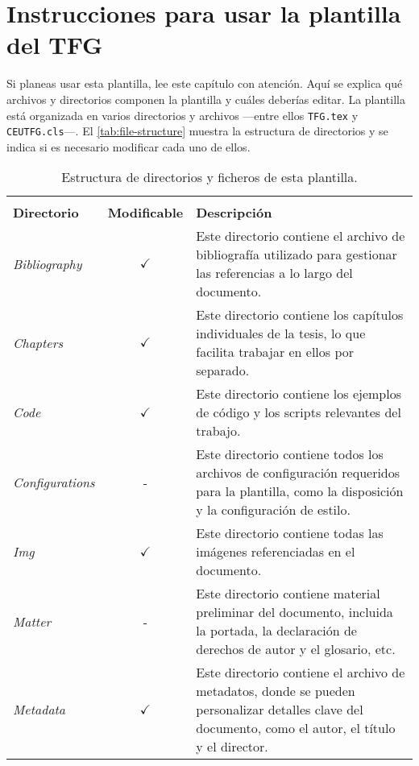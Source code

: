 \chapter[Instrucciones plantilla]{Instrucciones para usar la plantilla del TFG}
\label{cp:user-guide}

Si planeas usar esta plantilla, lee este capítulo con atención. Aquí se explica qué archivos y directorios componen la plantilla y cuáles deberías editar. La plantilla está organizada en varios directorios y archivos —entre ellos \texttt{TFG.tex} y \texttt{CEUTFG.cls}—. El \autoref{tab:file-structure} muestra la estructura de directorios y se indica si es necesario modificar cada uno de ellos.

\begin{table}[!htpb]
    \setlength{\extrarowheight}{2pt}
    \caption[Estructura de directorios y ficheros]{Estructura de directorios y ficheros de esta plantilla.}
    \label{tab:file-structure}
    \begin{tabularx}{\textwidth}{lcX}
        \toprule
        \\[-1.5\normalbaselineskip]
        \textbf{Directorio} & \textbf{Modificable} & \textbf{Descripción} \\ [0em]
        \midrule
        \textit{Bibliography} & $\checkmark$ & Este directorio contiene el archivo de bibliografía utilizado para gestionar las referencias a lo largo del documento. \\
        \textit{Chapters} & $\checkmark$ & Este directorio contiene los capítulos individuales de la tesis, lo que facilita trabajar en ellos por separado. \\
        \textit{Code} & $\checkmark$ & Este directorio contiene los ejemplos de código y los scripts relevantes del trabajo. \\
        \textit{Configurations} & - & Este directorio contiene todos los archivos de configuración requeridos para la plantilla, como la disposición y la configuración de estilo. \\
        \textit{Img} & $\checkmark$ & Este directorio contiene todas las imágenes referenciadas en el documento. \\
        \textit{Matter} & - & Este directorio contiene material preliminar del documento, incluida la portada, la declaración de derechos de autor y el glosario, etc. \\
        \textit{Metadata} & $\checkmark$ & Este directorio contiene el archivo de metadatos, donde se pueden personalizar detalles clave del documento, como el autor, el título y el director. \\
        \bottomrule
    \end{tabularx}
\end{table}


